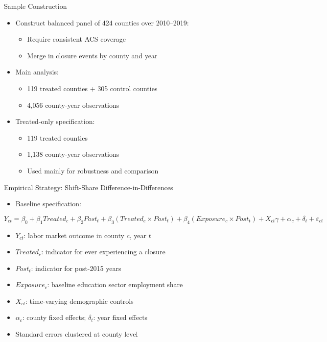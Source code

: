 \documentclass[aspectratio=169]{beamer}
\begin{document}
\begin{frame}{Sample Construction}
  \begin{itemize}
    \item Construct balanced panel of 424 counties over 2010--2019:
      \begin{itemize}
        \item Require consistent ACS coverage
        \item Merge in closure events by county and year
      \end{itemize}
    \item Main analysis:
      \begin{itemize}
        \item 119 treated counties + 305 control counties
        \item 4,056 county-year observations
      \end{itemize}
    \item Treated-only specification:
      \begin{itemize}
        \item 119 treated counties
        \item 1,138 county-year observations
        \item Used mainly for robustness and comparison
      \end{itemize}
  \end{itemize}
\end{frame}

\begin{frame}{Empirical Strategy: Shift-Share Difference-in-Differences}
  \begin{itemize}
    \item Baseline specification:
  \end{itemize}
  \[
    Y_{ct} = \beta_0 + \beta_1 Treated_c + \beta_2 Post_t
      + \beta_3 (Treated_c \times Post_t)
      + \beta_4 (Exposure_c \times Post_t)
      + X_{ct}\gamma + \alpha_c + \delta_t + \varepsilon_{ct}
  \]
  \begin{itemize}
    \item $Y_{ct}$: labor market outcome in county $c$, year $t$
    \item $Treated_c$: indicator for ever experiencing a closure
    \item $Post_t$: indicator for post-2015 years
    \item $Exposure_c$: baseline education sector employment share
    \item $X_{ct}$: time-varying demographic controls
    \item $\alpha_c$: county fixed effects; $\delta_t$: year fixed effects
    \item Standard errors clustered at county level
  \end{itemize}
\end{frame}
\end{document}
